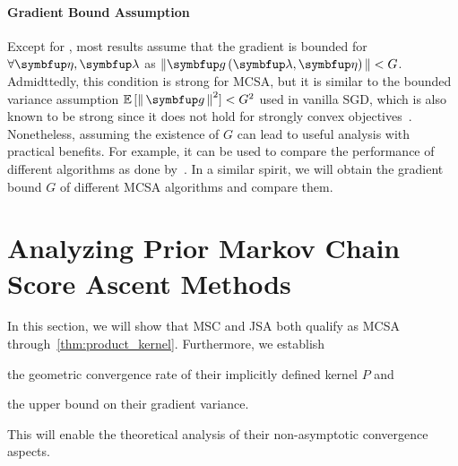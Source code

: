 \vspace{-0.1in}
\paragraph{Gradient Bound Assumption}
Except for \citet{doan_finitetime_2020}, most results assume that the gradient is bounded for \(\forall\veta,\vlambda\) as {\footnotesize\( {\| \vg\left(\vlambda, \veta\right) \|} < G \)}.
Admidttedly, this condition is strong for MCSA, but it is similar to the bounded variance assumption {\footnotesize\(\mathbb{E}\,[\norm{\vg}^2]  < G^2\)} used in vanilla SGD, which is also known to be strong since it does not hold for strongly convex objectives~\citep{pmlr-v80-nguyen18c}.
Nonetheless, assuming the existence of \(G\) can lead to useful analysis with practical benefits.
For example, it can be used to compare the performance of different algorithms as done by~\citet{pmlr-v108-geffner20a}.
In a similar spirit, we will obtain the gradient bound \(G\) of different MCSA algorithms and compare them.

\vspace{-0.05in}
\section{Analyzing Prior Markov Chain Score Ascent Methods}\label{section:comparison}
\vspace{-0.05in}
In this section, we will show that MSC and JSA both qualify as MCSA through~\cref{thm:product_kernel}.
Furthermore, we establish 
\begin{enumerate*}[label=\textbf{(\roman*)}]
  \item the geometric convergence rate of their implicitly defined kernel \(P\) and
  \item the upper bound on their gradient variance.
\end{enumerate*}
This will enable the theoretical analysis of their non-asymptotic convergence aspects.

\vspace{-0.05in}
